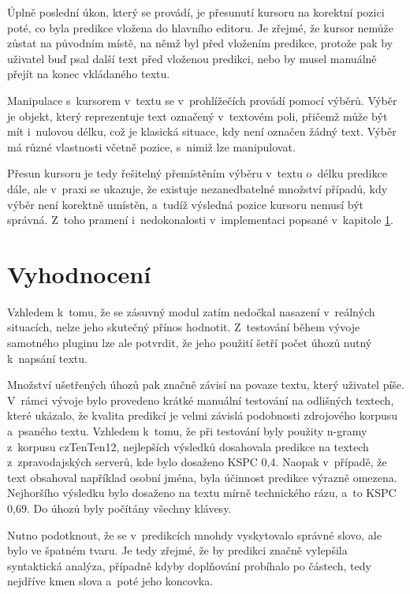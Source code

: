 \documentclass[a4paper,11pt,openany]{book} %
\begin{document}
Úplně poslední úkon, který se provádí, je přesunutí kursoru na korektní pozici poté, co byla predikce vložena do hlavního editoru. Je zřejmé, že kursor nemůže zůstat na původním místě, na němž byl před vložením predikce, protože pak by uživatel buď psal další text před vloženou predikci, nebo by musel manuálně přejít na konec vkládaného textu. 

Manipulace s~kursorem v~textu se v~prohlížečích provádí pomocí výběrů. Výběr je objekt, který reprezentuje text označený v~textovém poli, přičemž může být mít i~nulovou délku, což je klasická situace, kdy není označen žádný text. Výběr má různé vlastnosti včetně pozice, s~nimiž lze manipulovat. %

Přesun kursoru je tedy řešitelný přemístěním výběru v~textu o~délku predikce dále, ale v~praxi se ukazuje, že existuje nezanedbatelné množství případů, kdy výběr není korektně umístěn, a~tudíž výsledná pozice kursoru nemusí být správná. Z~toho pramení i~nedokonalosti v~implementaci popsané v~kapitole \ref{vyhodnoceni}.

\chapter{Vyhodnocení}\label{vyhodnoceni}

Vzhledem k~tomu, že se zásuvný modul zatím nedočkal nasazení v~reálných situacích, nelze jeho skutečný přínos hodnotit. Z~testování během vývoje samotného pluginu lze ale potvrdit, že jeho použití šetří počet úhozů nutný k~napsání textu. 

Množství ušetřených úhozů pak značně závisí na povaze textu, který uživatel píše. V~rámci vývoje bylo provedeno krátké manuální testování na odlišných textech, které ukázalo, že kvalita predikcí je velmi závislá podobnosti zdrojového korpusu a~psaného textu. Vzhledem k~tomu, že při testování byly použity n-gramy z~korpusu czTenTen12, nejlepších výsledků dosahovala predikce na textech z~zpravodajských serverů, kde bylo dosaženo KSPC 0,4. Naopak v~případě, že text obsahoval například osobní jména, byla účinnost predikce výrazně omezena. Nejhoršího výsledku bylo dosaženo na textu mírně technického rázu, a~to KSPC 0,69. Do úhozů byly počítány všechny klávesy.

Nutno podotknout, že se v~predikcích mnohdy vyskytovalo správné slovo, ale bylo ve špatném tvaru. Je tedy zřejmé, že by predikci značně vylepšila syntaktická analýza, případně kdyby doplňování probíhalo po částech, tedy nejdříve kmen slova a~poté jeho koncovka.
\end{document}
